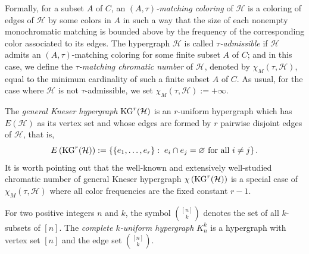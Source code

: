 \documentclass[11pt]{amsart}
\theoremstyle{definition}
\begin{document}
\noindent Formally, for a subset $A$ of $C$, an {\it $(A,\tau)$-matching coloring} of ${\mathcal H}$ is
a coloring of edges of ${\mathcal H}$ by some colors in $A$ in such a way that the size of each nonempty monochromatic matching is bounded above by the frequency of the corresponding color associated to its edges.
The hypergraph ${\mathcal H}$ is called {\it $\tau$-admissible} if ${\mathcal H}$ admits an $(A,\tau)$-matching coloring for some finite subset $A$ of $C$; and in this case, we define the {\it $\tau$-matching chromatic number} of ${\mathcal H}$, denoted by $\chi_M(\tau, {\mathcal H})$, equal to the minimum cardinality of such a finite subset $A$ of $C$. As usual, for the case where ${\mathcal H}$ is not $\tau$-admissible, we set $\chi_M(\tau, {\mathcal H}):=+\infty$.

The {\it general Kneser hypergraph} ${\rm KG}^r({\mathcal H})$ is an $r$-uniform hypergraph which has $E({\mathcal H})$ as its vertex set and  whose edges are formed by $r$ pairwise disjoint edges of ${\mathcal H}$, that is,
$$E\left({\rm KG}^r({\mathcal H})\right) :=\left\{\{e_1,\ldots,e_r\}:\; e_i\cap e_j=\varnothing \mbox{ for all } i\neq j\right\}.$$
It is worth pointing out that the well-known and extensively well-studied chromatic number of general Kneser hypergraph $\chi \left( {\rm KG}^r({\mathcal H}) \right)$ is a special case of $\chi_M(\tau, {\mathcal H})$ where all color frequencies are the fixed constant $r-1$.

\def\cprime{$'$} \def\cprime{$'$}
For two positive integers $n$ and $k$, the symbol ${[n]\choose k}$  denotes the set of all $k$-subsets of $[n]$.
The {\it complete $k$-uniform  hypergraph}  $K_n^k$ is a hypergraph with vertex set $[n]$ and the edge set ${[n]\choose k}$.
\end{document}
